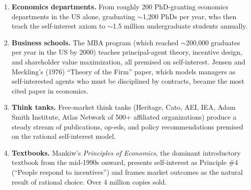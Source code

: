 \begin{enumerate}
  \item \textbf{Economics departments.}
  From roughly 200 PhD-granting economics departments in the US alone, graduating $\sim$1,200 PhDs per year, who then teach the self-interest axiom to $\sim$1.5 million undergraduate students annually.

  \item \textbf{Business schools.}
  The MBA program (which reached $\sim$200,000 graduates per year in the US by 2000) teaches principal-agent theory, incentive design, and shareholder value maximization, all premised on self-interest.
  Jensen and Meckling's (1976) ``Theory of the Firm'' paper, which models managers as self-interested agents who must be disciplined by contracts, became the most cited paper in economics.

  \item \textbf{Think tanks.}
  Free-market think tanks (Heritage, Cato, AEI, IEA, Adam Smith Institute, Atlas Network of 500+ affiliated organizations) produce a steady stream of publications, op-eds, and policy recommendations premised on the rational self-interest model.

  \item \textbf{Textbooks.}
  Mankiw's \emph{Principles of Economics}, the dominant introductory textbook from the mid-1990s onward, presents self-interest as Principle \#4 (``People respond to incentives'') and frames market outcomes as the natural result of rational choice.
  Over 4 million copies sold.
\end{enumerate}

